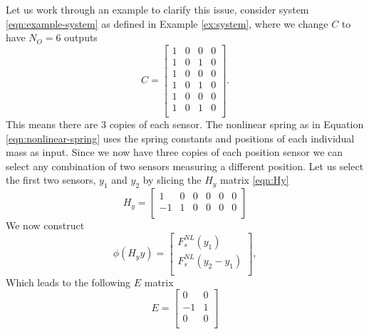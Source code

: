 \begin{example}\label{ex:nonlinear-issue}
    Let us work through an example to clarify this issue, consider system \eqref{eqn:example-system} as defined in Example \ref{ex:system}, where we change $C$ to have $N_O=6$ outputs
    \begin{equation}\label{eqn:NL-ex-C-6out}
        C = 
        \begin{bmatrix}
            1 & 0 & 0 & 0 \\
            1 & 0 & 1 & 0 \\
            1 & 0 & 0 & 0 \\
            1 & 0 & 1 & 0 \\
            1 & 0 & 0 & 0 \\
            1 & 0 & 1 & 0 \\
        \end{bmatrix}.
    \end{equation}
    This means there are 3 copies of each sensor. The nonlinear spring as in Equation \eqref{eqn:nonlinear-spring} uses the spring constants and positions of each individual mass as input. Since we now have three copies of each position sensor we can select any combination of two sensors measuring a different position. Let us select the first two sensors, $y_1$ and $y_2$ by slicing the $H_y$ matrix \eqref{eqn:Hy}
    \begin{equation*}
        H_y = 
        \begin{bmatrix}
            1 & 0 & 0 & 0 & 0 & 0 \\
            -1 & 1 & 0 & 0 & 0 & 0 \\
        \end{bmatrix}
    \end{equation*}
    We now construct
    \begin{equation}\label{eqn:NL-ex-phi-6out}
        \phi(H_yy) = 
        \begin{bmatrix}
            F^{NL}_s(y_1) \\ F^{NL}_s(y_2 - y_1) \\
        \end{bmatrix},
    \end{equation}
    Which leads to the following $E$ matrix
    \begin{equation}\label{eqn:NL-ex-E-6out}
        E =
        \begin{bmatrix}
            0 & 0 \\
            -1 & 1 \\
            0 & 0 \\

\end{bmatrix}
\end{equation}
\end{example}
